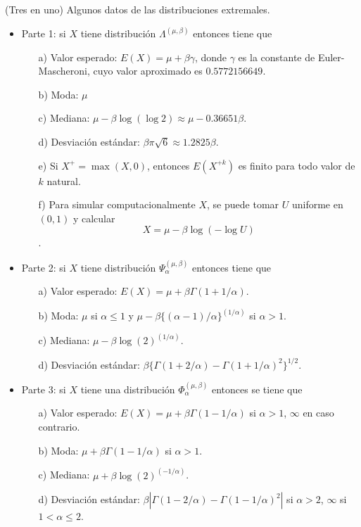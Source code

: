 \documentclass[
  12pt]{article}
\begin{document}
\begin{theorem}
(Tres en uno) Algunos datos de las distribuciones extremales.
\begin{itemize}
\item Parte 1: si $X$ tiene distribución $\Lambda^{(\mu,\beta)}$ entonces tiene que
\begin{itemize}
  \item[a)] Valor esperado: $E(X) = \mu + \beta\gamma$, donde $\gamma$ es la constante de Euler-Mascheroni, cuyo valor aproximado es $0.5772156649$.
  \item[b)] Moda: $\mu$
  \item[c)] Mediana: $\mu - \beta \log(\log 2) \approx \mu - 0.36651 \beta$.
  \item[d)] Desviación estándar: $\beta \pi \sqrt{6} \approx 1.2825 \beta$.
  \item[e)] Si $X^+ = \max(X,0)$, entonces $E(X^{+k})$ es finito para todo valor de $k$ natural.
  \item[f)] Para simular computacionalmente $X$, se puede tomar $U$ uniforme en $(0,1)$ y  calcular $$X = \mu - \beta \log(-\log U)$$.
\end{itemize}
\item Parte 2: si $X$ tiene distribución $\Psi_{\alpha}^{(\mu,\beta)}$ entonces tiene que
\begin{itemize}
  \item[a)] Valor esperado: $E(X) = \mu + \beta\Gamma(1+1/\alpha)$.
  \item[b)] Moda: $\mu$ si $\alpha\leq 1$ y $\mu-\beta\{(\alpha-1)/\alpha\}^{(1/\alpha)}$ si $\alpha>1$.
  \item[c)] Mediana: $\mu - \beta \log(2)^{(1/\alpha)}$.
  \item[d)] Desviación estándar: $\beta\{\Gamma(1+2/\alpha)-\Gamma(1+1/\alpha)^2\}^{1/2}$.
\end{itemize}
\item Parte 3: si $X$ tiene una distribución $\Phi_{\alpha}^{(\mu, \beta)}$ entonces se tiene que
\begin{itemize}
  \item[a)] Valor esperado: $E(X) = \mu + \beta\Gamma(1-1/\alpha)$ si $\alpha > 1$, $\infty$ en caso contrario.
  \item[b)] Moda: $\mu + \beta\Gamma(1-1/\alpha)$ si $\alpha>1$.
  \item[c)] Mediana: $\mu + \beta \log(2)^{(-1/\alpha)}$.
  \item[d)] Desviación estándar: $\beta|\Gamma(1-2/\alpha)-\Gamma(1-1/\alpha)^2|$ si $\alpha>2$, $\infty$ si $1<\alpha \leq 2$.
\end{itemize}
\end{itemize}
\end{theorem}
\end{document}
